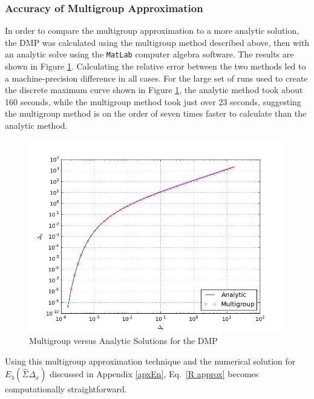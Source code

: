 \subsubsection{Accuracy of Multigroup Approximation}
In order to compare the multigroup approximation to a more analytic solution,
the DMP was calculated using the multigroup method described above, then with
an analytic solve using the \texttt{MatLab} computer algebra
software. The results are shown in Figure
\ref{mg_vs_anl}. Calculating the relative error between the two methods led to a
machine-precision difference in all cases.  For the large set of runs used to
create the discrete maximum curve shown in Figure \ref{mg_vs_anl}, the analytic
method took about 160 seconds, while the multigroup method took just over 23
seconds, suggesting the multigroup method is on the order of seven times faster
to calculate than the analytic method.
\begin{figure}[htb]
\centering
\includegraphics[width=0.7\linewidth]{graphics/DMP_mg_numR}
\caption{Multigroup versus Analytic Solutions for the DMP}
\label{mg_vs_anl}
\end{figure}

Using this  multigroup approximation technique
and the numerical solution for $E_3(\hat\Sigma\Delta_x)$ discussed in
Appendix \ref{apxEn}, Eq.\ \eqref{R approx} becomes computationally
straightforward.

